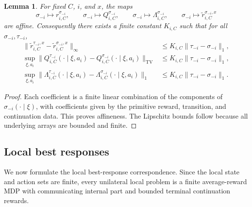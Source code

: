 \documentclass[12pt]{article}
\newtheorem{lemma}[theorem]{Lemma}
\theoremstyle{definition}
\newcommand{\1}{\mathbf{1}}
\begin{document}
\begin{lemma}
\label{lem:coeff-affine}
For fixed $C$, $i$, and $x$, the maps
\[
\sigma_{-i}\mapsto r_{i,C}^{\sigma_{-i}},
\qquad
\sigma_{-i}\mapsto Q_{i,C}^{\sigma_{-i}},
\qquad
\sigma_{-i}\mapsto \Lambda_{i,C}^{\sigma_{-i}},
\qquad
\sigma_{-i}\mapsto \widetilde r_{i,C}^{\sigma_{-i},x}
\]
are affine. Consequently there exists a finite constant $K_{i,C}$ such that for
all $\sigma_{-i},\tau_{-i}$,
\begin{align}
\|\widetilde r_{i,C}^{\tau_{-i},x}-\widetilde r_{i,C}^{\sigma_{-i},x}\|_\infty
&\le K_{i,C}\|\tau_{-i}-\sigma_{-i}\|_1,
\label{eq:r-lip}
\\
\sup_{\xi,a_i}\|Q_{i,C}^{\tau_{-i}}(\cdot\mid\xi,a_i)-Q_{i,C}^{\sigma_{-i}}(\cdot\mid\xi,a_i)\|_{\mathrm{TV}}
&\le K_{i,C}\|\tau_{-i}-\sigma_{-i}\|_1,
\label{eq:Q-lip}
\\
\sup_{\xi,a_i}\|\Lambda_{i,C}^{\tau_{-i}}(\cdot\mid\xi,a_i)-\Lambda_{i,C}^{\sigma_{-i}}(\cdot\mid\xi,a_i)\|_{1}
&\le K_{i,C}\|\tau_{-i}-\sigma_{-i}\|_1.
\label{eq:Lambda-lip}
\end{align}
\end{lemma}

\begin{proof}
Each coefficient is a finite linear combination of the components of
$\sigma_{-i}(\cdot\mid\xi)$, with coefficients given by the primitive reward,
transition, and continuation data. This proves affineness. The Lipschitz bounds
follow because all underlying arrays are bounded and finite.
\end{proof}

\subsection{Local best responses}

We now formulate the local best-response correspondence. Since the local state and
action sets are finite, every unilateral local problem is a finite average-reward
MDP with communicating internal part and bounded terminal continuation rewards.
\end{document}
